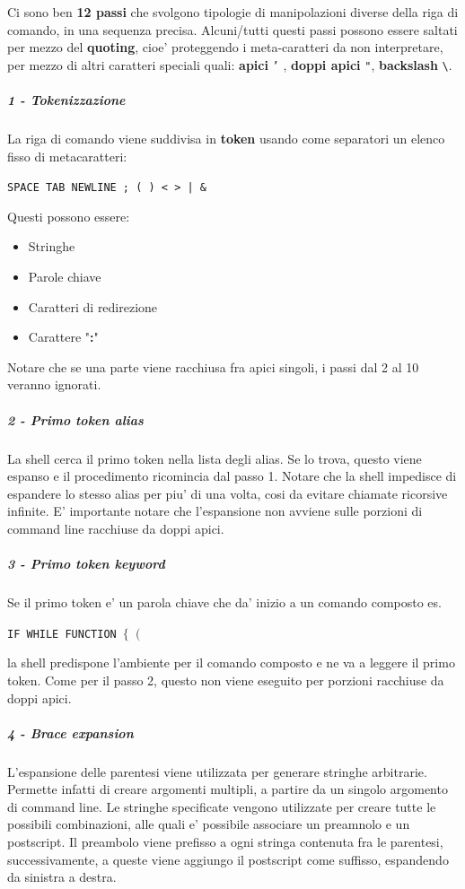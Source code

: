 Ci sono ben \textbf{12 passi} che svolgono tipologie di manipolazioni diverse della riga
di comando, in una sequenza precisa. Alcuni/tutti questi passi possono essere
saltati per mezzo del \textbf{quoting}, cioe' proteggendo i meta-caratteri da non
interpretare, per mezzo di altri caratteri speciali quali:
\textbf{apici} \texttt{'} ,
\textbf{doppi apici} \texttt{"},
\textbf{backslash} \texttt{\textbackslash}.


\subparagraph{1 - Tokenizzazione}
La riga di comando viene suddivisa in \textbf{token} usando come separatori un elenco
fisso di metacaratteri:
\begin{center}
	\texttt{SPACE TAB NEWLINE ; ( ) < > | \& } 
\end{center}
Questi possono essere:
\begin{itemize}
	\item Stringhe
	\item Parole chiave
	\item Caratteri di redirezione
	\item Carattere "\textbf{:}"
\end{itemize}
Notare che se una parte viene racchiusa fra apici singoli, i passi dal 2 al 10 
veranno ignorati.

\subparagraph{2 - Primo token alias}
La shell cerca il primo token nella lista degli alias. Se lo trova, questo viene
espanso e il procedimento ricomincia dal passo 1. Notare che la shell impedisce di 
espandere lo stesso alias per piu' di una volta, cosi da evitare chiamate ricorsive
infinite. E' importante notare che l'espansione non avviene sulle porzioni di command
line racchiuse da doppi apici.


\subparagraph{3 - Primo token keyword}
Se il primo token e' un parola chiave che da' inizio a un comando composto es.
\begin{center}
	\texttt{IF WHILE FUNCTION $\{$ $($}
\end{center}
la shell predispone l'ambiente per il comando composto e ne va a leggere il primo token.
Come per il passo 2, questo non viene eseguito per porzioni racchiuse da doppi apici.

\subparagraph{4 - Brace expansion}
L'espansione delle parentesi viene utilizzata per generare stringhe arbitrarie.
Permette infatti di creare argomenti multipli, a partire da un singolo argomento di 
command line. Le stringhe specificate vengono utilizzate per creare tutte le possibili 
combinazioni, alle quali e' possibile associare un preamnolo e un postscript.
Il preambolo viene prefisso a ogni stringa contenuta fra le parentesi, successivamente,
a queste viene aggiungo il postscript come suffisso, espandendo da sinistra a destra.

